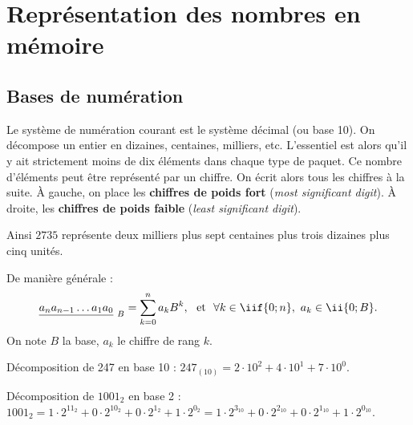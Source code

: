 \setchapterpreamble[u]{\margintoc}
\chapter{Représentation des nombres en mémoire}



\section{Bases de numération}

Le système de numération courant est le système décimal (ou base 10). 
On décompose un entier en dizaines, centaines, milliers, etc. 
L'essentiel est alors qu'il y ait strictement moins de dix éléments dans chaque type de paquet. Ce nombre d'éléments peut être représenté par un chiffre.
On écrit alors tous les chiffres à la suite. À gauche, on place les \textbf{chiffres de poids fort} (\textit{most significant digit}). À droite, les \textbf{chiffres de poids faible}  (\textit{least significant digit}).

Ainsi $2735$ représente deux milliers plus sept centaines plus trois dizaines plus cinq unités.

\begin{defi}
De manière générale :%
$$\displaystyle\underline{a_{n}a_{n-1}\ldots a_{1}a_{0}}_{~B} =
\sum_{k=0}^{n}a_{k}B^{k},~ \textrm{ et }~\forall k \in \iif{0;n},~ a_k\in\ii{0;B}.$$ 
On note $B$ la base, $a_k$ le chiffre de rang $k$.
\end{defi}

\begin{exemple}
Décomposition de 247 en base 10 : $247_{(10)} = 2\cdot 10^2 + 4\cdot 10^1 + 7\cdot 10^0$.

Décomposition de $1001_2$ en base 2 : $1001_2 = 1\cdot 2^{11_2} + 0\cdot 2^{10_2} + 0\cdot 2^{1_2} + 1\cdot 2^{0_2} 
= 1\cdot 2^{3_{10}} + 0\cdot 2^{2_{10}} + 0\cdot 2^{1_{10}} + 1\cdot 2^{0_{10}}$.
\end{exemple}



